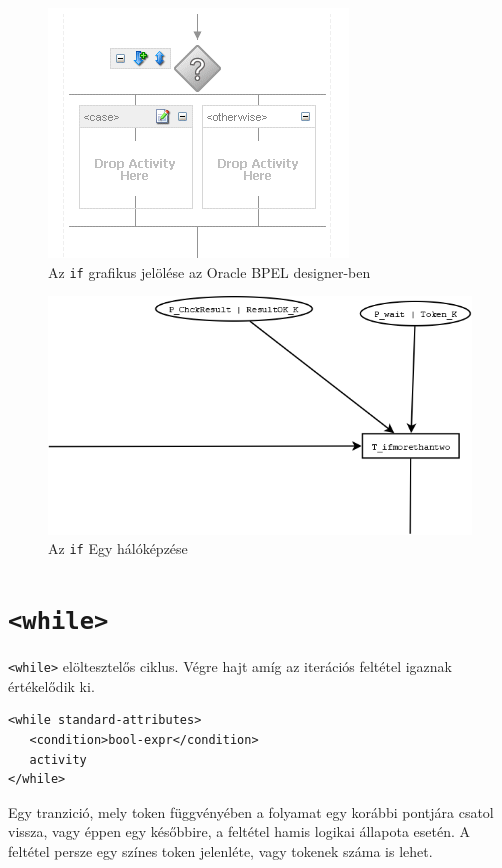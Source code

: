 \begin{figure}[h!]
\centering
\includegraphics[scale=1]{images/if.png}
\caption{Az \texttt{if} grafikus jelölése az Oracle BPEL designer-ben}
\label{fig:if}
\end{figure}


\begin{figure}[h!]
\centering
\includegraphics[scale=0.4]{images/ifnet.png}
\caption{Az \texttt{if} Egy hálóképzése}
\label{fig:ifnet}
\end{figure}

\section{\texttt{<while>}}
\texttt{<while>} elöltesztelős ciklus. Végre hajt amíg az iterációs feltétel igaznak értékelődik ki. 
\begin{verbatim}
<while standard-attributes>
   <condition>bool-expr</condition>
   activity
</while>
\end{verbatim}
Egy tranzició, mely token függvényében a folyamat egy korábbi pontjára csatol vissza, vagy éppen egy későbbire, a feltétel hamis logikai állapota esetén. A feltétel persze egy színes token jelenléte, vagy tokenek száma is lehet. 

